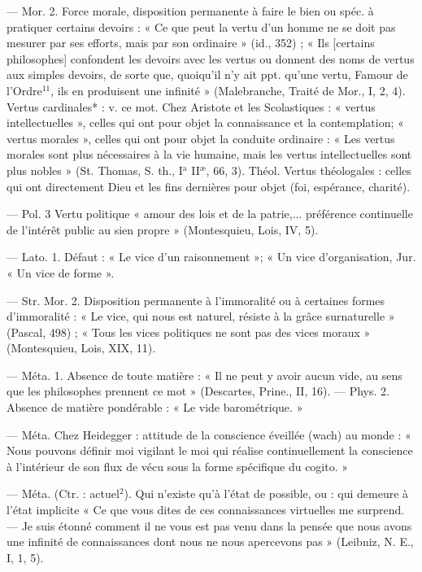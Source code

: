 \begin{itemize}[leftmargin=1cm, label=, itemsep=1pt]
— Mor. 2. Force morale, disposition permanente à faire le bien ou
spéc. à pratiquer certains devoirs :
« Ce que peut la vertu d’un homme
ne se doit pas mesurer par ses efforts,
mais par son ordinaire » (id., 352) ;
« Ils [certains philosophes] confondent les devoirs avec les vertus ou
donnent des noms de vertus aux
simples devoirs, de sorte que, quoiqu'il n’y ait ppt. qu’une vertu,
Famour de l'Ordre$^{11}$, ils en produisent une infinité » (Malebranche,
Traité de Mor., I, 2, 4). Vertus cardinales* : v. ce mot. Chez Aristote et
les Scolastiques : « vertus intellectuelles », celles qui ont pour objet
la connaissance et la contemplation;
« vertus morales », celles qui ont
pour objet la conduite ordinaire :
« Les vertus morales sont plus nécessaires à la vie humaine, mais les
vertus intellectuelles sont plus
nobles » (St. Thomas, S. th., I$^\text{a}$ II$^\text{æ}$,
66, 3). Théol. Vertus théologales :
celles qui ont directement Dieu et
les fins dernières pour objet (foi,
espérance, charité).

— Pol. 3 Vertu politique
« amour des lois et de la patrie,...
préférence continuelle de l'intérêt
public au sien propre » (Montesquieu, Lois, IV, 5).

 — Lato. 1. Défaut : « Le vice d’un
raisonnement »; « Un vice d’organisation, Jur. « Un vice de forme ».

— Str. Mor. 2. Disposition permanente à l’immoralité ou à certaines formes d’immoralité : « Le
vice, qui nous est naturel, résiste à la
grâce surnaturelle » (Pascal, 498) ;
« Tous les vices politiques ne sont
pas des vices moraux » (Montesquieu, Lois, XIX, 11).

 — Méta. 1. Absence de toute
matière : « Il ne peut y avoir aucun
vide, au sens que les philosophes
prennent ce mot » (Descartes, Prine.,
II, 16). — Phys. 2. Absence de matière pondérable : « Le vide barométrique. »

 — Méta. Chez Heidegger :
attitude de la conscience éveillée
(wach) au monde : « Nous pouvons
définir moi vigilant le moi qui réalise continuellement la conscience
à l’intérieur de son flux de vécu
sous la forme spécifique du cogito. »

 — Méta. (Ctr. : actuel$^2$). Qui
n'existe qu’à l’état de possible, ou :
qui demeure à l’état implicite
« Ce que vous dites de ces connaissances virtuelles me surprend. —
Je suis étonné comment il ne vous
est pas venu dans la pensée que
nous avons une infinité de connaissances dont nous ne nous apercevons pas » (Leibniz, N. E., I, 1, 5).


\end{itemize}
